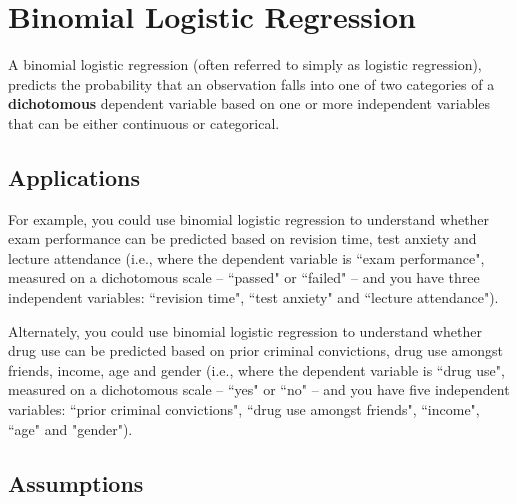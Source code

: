 \documentclass[12pt]{article}
\begin{document}
\tableofcontents
\newpage
\section{Binomial Logistic Regression} 
A binomial logistic regression (often referred to simply as logistic regression), predicts the probability that an observation falls into one of two categories of a \textbf{dichotomous} dependent variable based on one or more independent variables that can be either continuous or categorical.

\subsection{Applications}
For example, you could use binomial logistic regression to understand whether exam performance can be predicted based on revision time, test anxiety and lecture attendance (i.e., where the dependent variable is ``exam performance", measured on a dichotomous scale – ``passed" or ``failed" – and you have three independent variables: ``revision time", ``test anxiety" and ``lecture attendance"). 


Alternately, you could use binomial logistic regression to understand whether drug use can be predicted based on prior criminal convictions, drug use amongst friends, income, age and gender (i.e., where the dependent variable is ``drug use", measured on a dichotomous scale – ``yes" or ``no" – and you have five independent variables: ``prior criminal convictions", ``drug use amongst friends", ``income", ``age" and "gender").
\newpage
\subsection{Assumptions}
\end{document}
